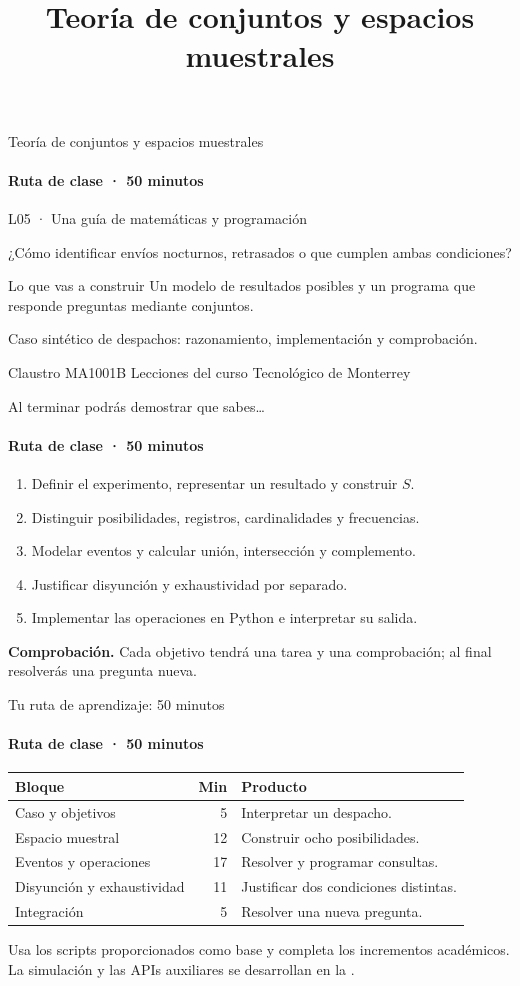 \documentclass[aspectratio=169,11pt,spanish]{beamer}
\title[L05 · \ruta]{Teoría de conjuntos y espacios muestrales}
\newcommand{\objetivo}[1]{{\small\color{TecAzul}#1\par}\medskip}
\newcommand{\verifica}[1]{\par\smallskip\textbf{Comprobación.} #1\par}
\begin{document}
\begin{frame}{Teoría de conjuntos y espacios muestrales}
\framesubtitle{Ruta de clase · 50 minutos}
\objetivo{L05 · Una guía de matemáticas y programación}
¿Cómo identificar envíos nocturnos, retrasados o que cumplen ambas condiciones?
\begin{block}{Lo que vas a construir}
Un modelo de resultados posibles y un programa que responde preguntas mediante conjuntos.
\end{block}
Caso sintético de despachos: razonamiento, implementación y comprobación.
\par\medskip
{\footnotesize Claustro MA1001B \textbar{} Lecciones del curso \textbar{} Tecnológico de Monterrey}
\end{frame}

\begin{frame}{Al terminar podrás demostrar que sabes…}
\framesubtitle{Ruta de clase · 50 minutos}
\begin{enumerate}
\item Definir el experimento, representar un resultado y construir $S$.
\item Distinguir posibilidades, registros, cardinalidades y frecuencias.
\item Modelar eventos y calcular unión, intersección y complemento.
\item Justificar disyunción y exhaustividad por separado.
\item Implementar las operaciones en Python e interpretar su salida.
\end{enumerate}
\verifica{Cada objetivo tendrá una tarea y una comprobación; al final resolverás una pregunta nueva.}
\end{frame}

\begin{frame}{Tu ruta de aprendizaje: 50 minutos}
\framesubtitle{Ruta de clase · 50 minutos}
\begin{tabular}{p{.32\linewidth}rp{.47\linewidth}}
\toprule Bloque & Min & Producto \\ \midrule
Caso y objetivos & 5 & Interpretar un despacho.\\
Espacio muestral & 12 & Construir ocho posibilidades.\\
Eventos y operaciones & 17 & Resolver y programar consultas.\\
Disyunción y exhaustividad & 11 & Justificar dos condiciones distintas.\\
Integración & 5 & Resolver una nueva pregunta.\\ \bottomrule
\end{tabular}\par
\medskip
Usa los scripts proporcionados como base y completa los incrementos académicos.
La simulación y las APIs auxiliares se desarrollan en la \hyperlink{consulta}{}.
\end{frame}
\end{document}

